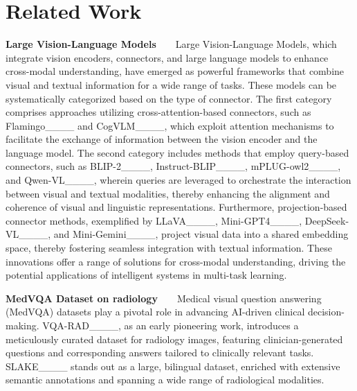 \section{Related Work}
\noindent \textbf{Large Vision-Language Models} ~ ~ Large Vision-Language Models, which integrate vision encoders, connectors, and large language models to enhance cross-modal understanding, have emerged as powerful frameworks that combine visual and textual information for a wide range of tasks. These models can be systematically categorized based on the type of connector. The first category comprises approaches utilizing cross-attention-based connectors, such as Flamingo____ and CogVLM____, which exploit attention mechanisms to facilitate the exchange of information between the vision encoder and the language model. The second category includes methods that employ query-based connectors, such as BLIP-2____, Instruct-BLIP____, mPLUG-owl2____, and Qwen-VL____, wherein queries are leveraged to orchestrate the interaction between visual and textual modalities, thereby enhancing the alignment and coherence of visual and linguistic representations. Furthermore, projection-based connector methods, exemplified by LLaVA____, Mini-GPT4____, DeepSeek-VL____, and Mini-Gemini____, project visual data into a shared embedding space, thereby fostering seamless integration with textual information.
These innovations offer a range of solutions for cross-modal understanding, driving the potential applications of intelligent systems in multi-task learning.



\noindent \textbf{MedVQA Dataset on radiology} ~ ~ Medical visual question answering (MedVQA) datasets play a pivotal role in advancing AI-driven clinical decision-making. VQA-RAD____, as an early pioneering work, introduces a meticulously curated dataset for radiology images, featuring clinician-generated questions and corresponding answers tailored to clinically relevant tasks. SLAKE____ stands out as a large, bilingual dataset, enriched with extensive semantic annotations and spanning a wide range of radiological modalities. 

